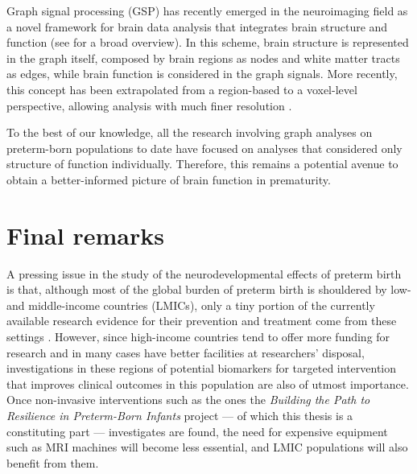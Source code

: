 Graph signal processing (GSP) has recently emerged in the neuroimaging field as a novel framework for brain data analysis that integrates brain structure and function (see \citet{Huang2018} for a broad overview). In this scheme, brain structure is represented in the graph itself, composed by brain regions as nodes and white matter tracts as edges, while brain function is considered in the graph signals. More recently, this concept has been extrapolated from a region-based to a voxel-level perspective, allowing analysis with much finer resolution \citep{Tarun2020}.

To the best of our knowledge, all the research involving graph analyses on preterm-born populations to date have focused on analyses that considered only structure of function individually. Therefore, this remains a potential avenue to obtain a better-informed picture of brain function in prematurity.


\section{Final remarks}

A pressing issue in the study of the neurodevelopmental effects of preterm birth is that, although most of the global burden of preterm birth is shouldered by low- and middle-income countries (LMICs), only a tiny portion of the currently available research evidence for their prevention and treatment come from these settings \citep{Smid2016}. However, since high-income countries tend to offer more funding for research and in many cases have better facilities at researchers' disposal, investigations in these regions of potential biomarkers for targeted intervention that improves clinical outcomes in this population are also of utmost importance. Once non-invasive interventions such as the ones the \textit{Building the Path to Resilience in Preterm-Born Infants} project --- of which this thesis is a constituting part --- investigates are found, the need for expensive equipment such as MRI machines will become less essential, and LMIC populations will also benefit from them.  
